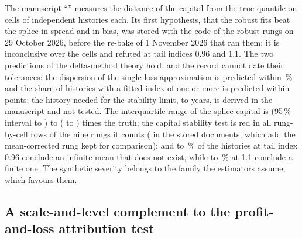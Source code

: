 The manuscript ``\pxPaperTitleTwelve{}'' measures the distance of the capital from the true quantile on \pxPpTwelveCells{} cells of \pxPpTwelvePer{} independent histories each. Its first hypothesis, that the robust
fits beat the splice in spread and in bias, was stored with the code of the robust rungs on 29 October 2026, before the re-bake of 1 November 2026 that ran them; it is inconclusive over the \pxPpTwelveCells{}
cells and refuted at tail indices 0.96 and 1.1. The two predictions of the delta-method theory hold, and the record cannot date their tolerances: the dispersion of the single loss approximation is predicted within
\pxPpTwelveThErr{}\,\% and the share of histories with a fitted index of one or more is predicted within \pxPpTwelveShErr{} points; the history needed for the stability limit, \pxPpTwelveYrsMin{} to \pxPpTwelveYrsMax{} years, is derived in the manuscript and not tested. The interquartile range of the splice capital is \pxPpTwelveIqrMin{} (95\,\% interval
\pxPpTwelveMinLo{} to \pxPpTwelveMinHi{}) to \pxPpTwelveIqrMax{} (\pxPpTwelveMaxLo{} to \pxPpTwelveMaxHi{}) times the truth; the capital stability test is red in all \pxPpTwelveRed{} rung-by-cell rows of the
nine rungs it counts (\pxTwelveRedRows{} in the stored documents, which add the mean-corrected rung kept for comparison); and \pxPpTwelveInfLo{} to \pxPpTwelveInfHi{}\,\% of the histories at tail index 0.96 conclude
an infinite mean that does not exist, while \pxPpTwelveFinLo{} to \pxPpTwelveFinHi{}\,\% at 1.1 conclude a finite one. The synthetic severity belongs to the family the estimators assume, which favours them.

\subsection{A scale-and-level complement to the profit-and-loss attribution test}
\label{sec:bs13}

